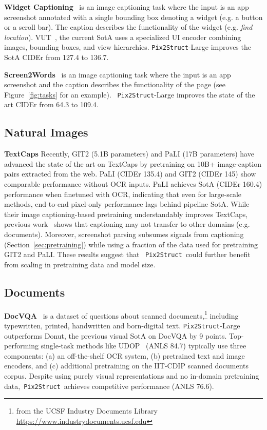 \documentclass{article} \usepackage[accepted]{icml2023}
\newcommand\ourmodel{{\texttt{Pix2Struct}}}
\begin{document}
\textbf{Widget Captioning}~\citep{li-etal-2020-widget} is an image captioning task where the input is an app screenshot annotated with a single bounding box denoting a widget (e.g. a button or a scroll bar). The caption describes the functionality of the widget (e.g. \emph{find location}).
VUT~\citep{li2021vut}, the current SotA uses a specialized UI encoder combining images, bounding boxes, and view hierarchies. \ourmodel-Large improves the SotA CIDEr from 127.4 to 136.7.

\textbf{Screen2Words}~\citep{screen2words} is an image captioning task where the input is an app screenshot and the caption describes the functionality of the page (see Figure~\ref{fig:tasks} for an example).
~\ourmodel-Large improves the state of the art CIDEr from 64.3 to 109.4.

\subsection{Natural Images}
\textbf{TextCaps}
Recently, GIT2 (5.1B parameters) and PaLI (17B parameters) have advanced the state of the art on TextCaps by pretraining on 10B+ image-caption pairs extracted from the web.
PaLI (CIDEr 135.4) and GIT2 (CIDEr 145) show comparable performance without OCR inputs. PaLI achieves SotA (CIDEr 160.4) performance when finetuned with OCR, indicating that even for large-scale methods, end-to-end pixel-only performance lags behind pipeline SotA. While their image captioning-based pretraining understandably improves TextCaps, previous work~\citep{donut} shows that captioning may not transfer to other domains (e.g. documents). Moreover, screenshot parsing subsumes signals from  captioning (Section~\ref{sec:pretraining}) while using a fraction of the data used for pretraining GIT2 and PaLI. These results suggest that ~\ourmodel~could further benefit from scaling in pretraining data and model size.

\subsection{Documents}

\textbf{DocVQA}~\citep{mathew2021docvqa} is a dataset of questions about scanned documents,\footnote{from the UCSF Industry Documents Library \url{https://www.industrydocuments.ucsf.edu}} including typewritten, printed, handwritten and born-digital text.
\ourmodel-Large outperforms Donut, the previous visual SotA on DocVQA by 9 points. Top-performing single-task methods like 
UDOP~\citep{tang2022unifying} (ANLS 84.7)
typically use three components: (a) an off-the-shelf OCR system, (b) pretrained text and image encoders, and (c) additional pretraining on the IIT-CDIP scanned documents corpus. Despite using purely visual representations and no in-domain pretraining data,~\ourmodel~achieves competitive performance (ANLS 76.6). 
\end{document}
